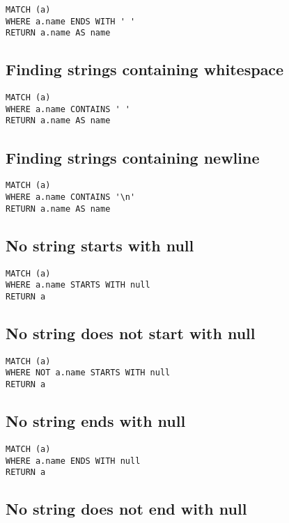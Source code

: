 \begin{lstlisting}
MATCH (a)
WHERE a.name ENDS WITH ' '
RETURN a.name AS name
\end{lstlisting}

\subsection{Finding strings containing whitespace}

\begin{lstlisting}
MATCH (a)
WHERE a.name CONTAINS ' '
RETURN a.name AS name
\end{lstlisting}

\subsection{Finding strings containing newline}

\begin{lstlisting}
MATCH (a)
WHERE a.name CONTAINS '\n'
RETURN a.name AS name
\end{lstlisting}

\subsection{No string starts with null}

\begin{lstlisting}
MATCH (a)
WHERE a.name STARTS WITH null
RETURN a
\end{lstlisting}

\subsection{No string does not start with null}

\begin{lstlisting}
MATCH (a)
WHERE NOT a.name STARTS WITH null
RETURN a
\end{lstlisting}

\subsection{No string ends with null}

\begin{lstlisting}
MATCH (a)
WHERE a.name ENDS WITH null
RETURN a
\end{lstlisting}

\subsection{No string does not end with null}

